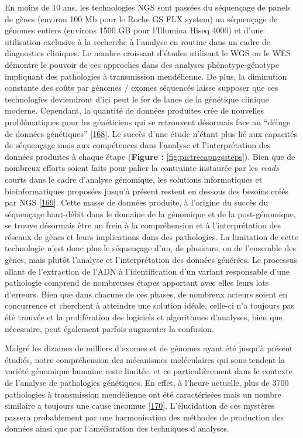 \documentclass[12pt,a4paper,twoside]{ugathesis}
\theoremstyle{definition}
\theoremstyle{definition}
\theoremstyle{definition}
\theoremstyle{remark}
\begin{document}
En moins de 10 ans, les technologies NGS sont passées du séquençage de
panels de gènes (environ 100 Mb pour le Roche GS FLX system) au
séquençage de génomes entiers (environs 1500 GB pour l'Illumina Hiseq
4000) et d'une utilisation exclusive à la recherche à l'analyse en
routine dans un cadre de diagnostics cliniques. Le nombre croissant
d'études utilisant le WGS ou le WES démontre le pouvoir de ces approches
dans des analyses phénotype-génotype impliquant des pathologies à
transmission mendélienne. De plus, la diminution constante des coûts par
génomes / exomes séquencés laisse supposer que ces technologies
deviendront d'ici peut le fer de lance de la génétique clinique moderne.
Cependant, la quantité de données produites crée de nouvelles
problématiques pour les généticiens qui se retrouvent désormais face au
``déluge de données génétiques''
{[}\protect\hyperlink{ref-Schatz2013}{168}{]}. Le succès d'une étude
n'étant plus lié aux capacités de séquençage mais aux compétences dans
l'analyse et l'interprétation des données produites à chaque étape
(\textbf{Figure :} \ref{fig:pictrecapngssteps}). Bien que de nombreux
efforts soient faits pour palier la contrainte instaurée par les
\emph{reads} courts dans le cadre d'analyse génomique, les solutions
informatiques et bioinformatiques proposées jusqu'à présent restent en
dessous des besoins créés par NGS
{[}\protect\hyperlink{ref-McPherson2009}{169}{]}. Cette masse de données
produite, à l'origine du succès du séquençage haut-débit dans le domaine
de la génomique et de la post-génomique, se trouve désormais être un
frein à la compréhension et à l'interprétation des réseaux de gènes et
leurs implications dans des pathologies. La limitation de cette
technologie n'est donc plus le séquençage d'un, de plusieurs, ou de
l'ensemble des gènes, mais plutôt l'analyse et l'interprétation des
données générées. Le processus allant de l'extraction de l'ADN à
l'identification d'un variant responsable d'une pathologie comprend de
nombreuses étapes apportant avec elles leurs lots d'erreurs. Bien que
dans chacune de ces phases, de nombreux acteurs soient en concurrence et
cherchent à atteindre une solution idéale, celle-ci n'a toujours pas été
trouvée et la prolifération des logiciels et algorithmes d'analyses,
bien que nécessaire, peut également parfois augmenter la confusion.

Malgré les dizaines de milliers d'exomes et de génomes ayant été jusqu'à
présent étudiés, notre compréhension des mécanismes moléculaires qui
sous-tendent la variété génomique humaine reste limitée, et ce
particulièrement dans le contexte de l'analyse de pathologies
génétiques. En effet, à l'heure actuelle, plus de 3700 pathologies à
transmission mendélienne ont été caractérisées mais un nombre similaire
a toujours une cause inconnue
{[}\protect\hyperlink{ref-Amberger2011}{170}{]}. L'élucidation de ces
mystères passera probablement par une harmonisation des méthodes de
production des données ainsi que par l'amélioration des techniques
d'analyses.
\end{document}
